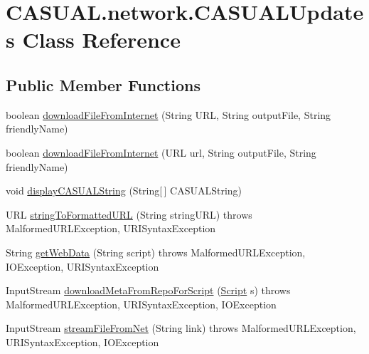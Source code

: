 \hypertarget{class_c_a_s_u_a_l_1_1network_1_1_c_a_s_u_a_l_updates}{\section{C\-A\-S\-U\-A\-L.\-network.\-C\-A\-S\-U\-A\-L\-Updates Class Reference}
\label{class_c_a_s_u_a_l_1_1network_1_1_c_a_s_u_a_l_updates}
}
\subsection*{Public Member Functions}
\begin{DoxyCompactItemize}
\item 
boolean \hyperlink{class_c_a_s_u_a_l_1_1network_1_1_c_a_s_u_a_l_updates_a9bfc14b6130b3d0fd9e4d9fd66674938}{download\-File\-From\-Internet} (String U\-R\-L, String output\-File, String friendly\-Name)
\item 
boolean \hyperlink{class_c_a_s_u_a_l_1_1network_1_1_c_a_s_u_a_l_updates_a744e587848a05d43eef7aa75e3c30e8b}{download\-File\-From\-Internet} (U\-R\-L url, String output\-File, String friendly\-Name)
\item 
void \hyperlink{class_c_a_s_u_a_l_1_1network_1_1_c_a_s_u_a_l_updates_a0bb12c8c206be8c0814ad231ad02a104}{display\-C\-A\-S\-U\-A\-L\-String} (String\mbox{[}$\,$\mbox{]} C\-A\-S\-U\-A\-L\-String)
\item 
U\-R\-L \hyperlink{class_c_a_s_u_a_l_1_1network_1_1_c_a_s_u_a_l_updates_abb67fb934011f1386b09742f475f137c}{string\-To\-Formatted\-U\-R\-L} (String string\-U\-R\-L)  throws Malformed\-U\-R\-L\-Exception, U\-R\-I\-Syntax\-Exception 
\item 
String \hyperlink{class_c_a_s_u_a_l_1_1network_1_1_c_a_s_u_a_l_updates_a9b8929945452d42e11476348eaa0bb91}{get\-Web\-Data} (String script)  throws Malformed\-U\-R\-L\-Exception, I\-O\-Exception, U\-R\-I\-Syntax\-Exception 
\item 
Input\-Stream \hyperlink{class_c_a_s_u_a_l_1_1network_1_1_c_a_s_u_a_l_updates_a8bc8251abf97e6fb59fe2478d0a34806}{download\-Meta\-From\-Repo\-For\-Script} (\hyperlink{class_c_a_s_u_a_l_1_1caspac_1_1_script}{Script} s)  throws Malformed\-U\-R\-L\-Exception, U\-R\-I\-Syntax\-Exception, I\-O\-Exception 
\item 
Input\-Stream \hyperlink{class_c_a_s_u_a_l_1_1network_1_1_c_a_s_u_a_l_updates_ae40ac8c5ffe9d0b49214bfd9e7169304}{stream\-File\-From\-Net} (String link)  throws Malformed\-U\-R\-L\-Exception, U\-R\-I\-Syntax\-Exception, I\-O\-Exception 

\end{DoxyCompactItemize}
